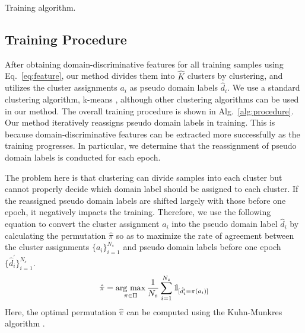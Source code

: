 \documentclass[letterpaper]{article} \usepackage{aaai20}  \usepackage{times}  \usepackage{helvet} \usepackage{courier}  \usepackage[hyphens]{url}  \usepackage{graphicx} \urlstyle{rm} \def\UrlFont{\rm}  \usepackage{graphicx}  \usepackage[whole]{bxcjkjatype}
\newcommand{\argmax}{\mathop{\mathrm{arg~max}}\limits}
\begin{document}
\begin{algorithm}[t]
\caption{Training algorithm.}
\label{alg:procedure}
\begin{algorithmic}
\ENDWHILE
{}
\ENDWHILE
\end{algorithmic}
\end{algorithm}

\subsection{Training Procedure}
After obtaining domain-discriminative features for all training samples using Eq.~\ref{eq:feature}, our method divides them into $\hat{K}$ clusters by clustering, and utilizes the cluster assignments $a_i$ as pseudo domain labels $\hat{d}_i$. We use a standard clustering algorithm, k-means \cite{Kmeans}, although other clustering algorithms can be used in our method. The overall training procedure is shown in Alg.~\ref{alg:procedure}. Our method iteratively reassigns pseudo domain labels in training.
This is because domain-discriminative features can be extracted more successfully as the training progresses.
In particular, we determine that the reassignment of pseudo domain labels is conducted for each epoch.\par
The problem here is that clustering can divide samples into each cluster but cannot properly decide which domain label should be assigned to each cluster.
If the reassigned pseudo domain labels are shifted largely with those before one epoch, it negatively impacts the training. Therefore, we use the following equation to convert the cluster assignment $a_i$ into the pseudo domain label $\hat{d}_i$ by calculating the permutation $\hat{\pi}$ so as to maximize the rate of agreement between the cluster assignments $\{a_i\}_{i=1}^{N_s}$ and pseudo domain labels before one epoch $\{\hat{d}_i^{\prime}\}_{i=1}^{N_s}$.
\begin{equation}
\hat{\pi}=\argmax_{\pi\in\Pi}\frac{1}{N_s}\sum_{i=1}^{N_s}\1_{[\hat{d}_i^{\prime}=\pi(a_i)]}
\label{eq:perm}
\end{equation}
Here, the optimal permutation $\hat{\pi}$ can be computed using the Kuhn-Munkres algorithm \cite{Kuhn_Munkres}.
\end{document}
